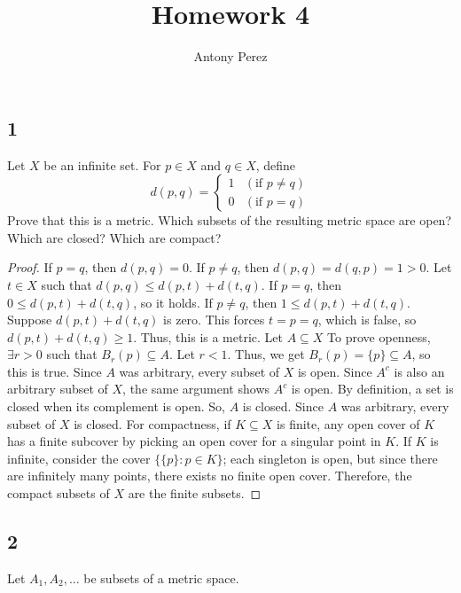 \documentclass{amsart}
\title{Homework 4}
\author{Antony Perez}
\begin{document}
\maketitle    
\newtheorem{lemma}{Lemma}
\subsection*{1} Let $X$ be an infinite set. For $p \in X$ and $q \in X$, define 
\[d(p,q) = \begin{cases}
    1 & (\text{if } p \neq q) \\ 
    0 & (\text{if } p = q)
\end{cases}\]
Prove that this is a metric. Which subsets of the resulting metric space are open? Which are closed? Which are compact?
\begin{proof}
    If $p=q$, then $d(p,q)=0$. If $p \neq q$, then $d(p,q) = d(q,p) = 1 > 0$. Let $t \in X$ such that $d(p,q) \leq d(p,t) + d(t,q)$. If $p=q$, then $0 \leq d(p,t) + d(t,q)$, so it holds. If $p \neq q$, then $1 \leq d(p,t) + d(t,q)$. Suppose $d(p,t) + d(t,q)$ is zero. This forces $t = p = q$, which is false, so $d(p,t) + d(t,q) \geq 1$. Thus, this is a metric. Let $A \subseteq X$ To prove openness, $\exists r > 0$ such that $B_r(p) \subseteq A$. Let $r <1$. Thus, we get $B_r(p) = \{p\} \subseteq A$, so this is true. Since $A$ was arbitrary, every subset of $X$ is open. Since $A^c$ is also an arbitrary subset of $X$, the same argument shows $A^c$ is open. By definition, a set is closed when its complement is open. So, $A$ is closed. Since $A$ was arbitrary, every subset of $X$ is closed. For compactness, if $K \subseteq X$ is finite, any open cover of $K$ has a finite subcover by picking an open cover for a singular point in $K$. If $K$ is infinite, consider the cover $\{\{p\} : p \in K\}$; each singleton is open, but since there are infinitely many points, there exists no finite open cover. Therefore, the compact subsets of $X$ are the finite subsets.
\end{proof}
\subsection*{2} Let $A_1,A_2,\ldots$ be subsets of a metric space.
\end{document}
